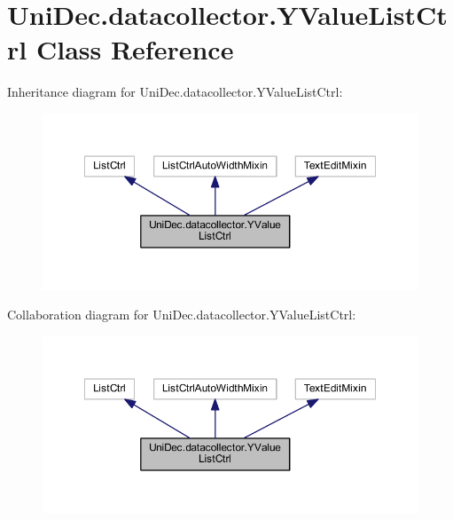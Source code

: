 \hypertarget{class_uni_dec_1_1datacollector_1_1_y_value_list_ctrl}{}\section{Uni\+Dec.\+datacollector.\+Y\+Value\+List\+Ctrl Class Reference}
\label{class_uni_dec_1_1datacollector_1_1_y_value_list_ctrl}


Inheritance diagram for Uni\+Dec.\+datacollector.\+Y\+Value\+List\+Ctrl\+:\nopagebreak
\begin{figure}[H]
\begin{center}
\leavevmode
\includegraphics[width=350pt]{class_uni_dec_1_1datacollector_1_1_y_value_list_ctrl__inherit__graph}
\end{center}
\end{figure}


Collaboration diagram for Uni\+Dec.\+datacollector.\+Y\+Value\+List\+Ctrl\+:\nopagebreak
\begin{figure}[H]
\begin{center}
\leavevmode
\includegraphics[width=350pt]{class_uni_dec_1_1datacollector_1_1_y_value_list_ctrl__coll__graph}
\end{center}
\end{figure}
